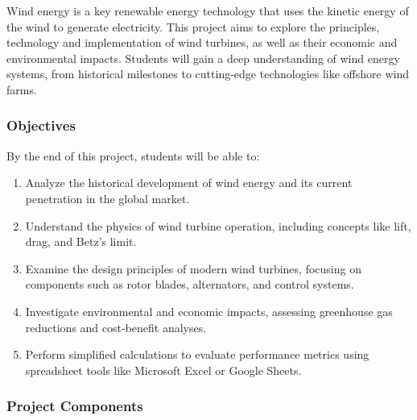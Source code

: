 \documentclass[11pt]{article}
\begin{document}
Wind energy is a key renewable energy technology that uses the kinetic energy of the wind to generate electricity. This project aims to explore the principles, technology and implementation of wind turbines, as well as their economic and environmental impacts. Students will gain a deep understanding of wind energy systems, from historical milestones to cutting-edge technologies like offshore wind farms.

\subsubsection*{Objectives}

By the end of this project, students will be able to:

\begin{enumerate}
    \item Analyze the historical development of wind energy and its current penetration in the global market.
    \item Understand the physics of wind turbine operation, including concepts like lift, drag, and Betz's limit.
    \item Examine the design principles of modern wind turbines, focusing on components such as rotor blades, alternators, and control systems.
    \item Investigate environmental and economic impacts, assessing greenhouse gas reductions and cost-benefit analyses.
    \item Perform simplified calculations to evaluate performance metrics using spreadsheet tools like Microsoft Excel or Google Sheets.
\end{enumerate}

\subsubsection*{Project Components}
\end{document}
